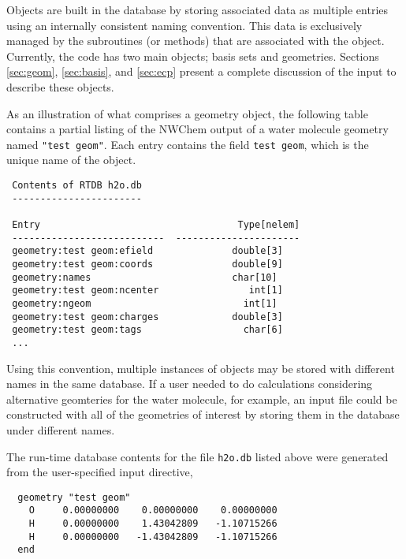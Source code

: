 Objects are built in the database by storing associated data as
multiple entries using an internally consistent naming convention.
This data is exclusively managed by the subroutines (or methods) that
are associated with the object.  Currently, the code has two main
objects; basis sets and geometries.  Sections \ref{sec:geom}, 
\ref{sec:basis}, and
\ref{sec:ecp} present a complete discussion of the input to describe
these objects.  

As an illustration of what comprises a geometry object, the following
table contains a partial listing of the NWChem output of a water molecule
geometry named \verb+"test geom"+.  Each entry contains the field 
\verb+test geom+, which is the unique name of the object.

\begin{verbatim}
 Contents of RTDB h2o.db
 -----------------------

 Entry                                   Type[nelem]
 ---------------------------  ----------------------
 geometry:test geom:efield              double[3]    
 geometry:test geom:coords              double[9]    
 geometry:names                         char[10]   
 geometry:test geom:ncenter                int[1]    
 geometry:ngeom                           int[1]    
 geometry:test geom:charges             double[3]    
 geometry:test geom:tags                  char[6]
 ...
\end{verbatim}

Using this convention, multiple instances of objects may be stored with
different names in the same database.  If a user needed to do calculations 
considering alternative geomteries
for the water molecule, for example, an input file could be constructed with 
all of the geometries of interest by storing them in the 
database under different names.  


The run-time database contents for the file \verb+h2o.db+ listed 
above were generated from the user-specified input directive,
\begin{verbatim}
  geometry "test geom"
    O     0.00000000    0.00000000    0.00000000
    H     0.00000000    1.43042809   -1.10715266
    H     0.00000000   -1.43042809   -1.10715266
  end
\end{verbatim}


